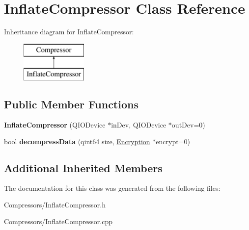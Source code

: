 \hypertarget{class_inflate_compressor}{}\section{Inflate\+Compressor Class Reference}
\label{class_inflate_compressor}
Inheritance diagram for Inflate\+Compressor\+:\begin{figure}[H]
\begin{center}
\leavevmode
\includegraphics[height=2.000000cm]{class_inflate_compressor}
\end{center}
\end{figure}
\subsection*{Public Member Functions}
\begin{DoxyCompactItemize}
\item 
{\bfseries Inflate\+Compressor} (Q\+I\+O\+Device $\ast$in\+Dev, Q\+I\+O\+Device $\ast$out\+Dev=0)\hypertarget{class_inflate_compressor_afc233237acd902e75d6ef9f3e0a21e2d}{}\label{class_inflate_compressor_afc233237acd902e75d6ef9f3e0a21e2d}

\item 
bool {\bfseries decompress\+Data} (qint64 size, \hyperlink{class_encryption}{Encryption} $\ast$encrypt=0)\hypertarget{class_inflate_compressor_a219c3bb5c42b537283f665ad5057edbd}{}\label{class_inflate_compressor_a219c3bb5c42b537283f665ad5057edbd}

\end{DoxyCompactItemize}
\subsection*{Additional Inherited Members}


The documentation for this class was generated from the following files\+:\begin{DoxyCompactItemize}
\item 
Compressors/Inflate\+Compressor.\+h\item 
Compressors/Inflate\+Compressor.\+cpp\end{DoxyCompactItemize}
